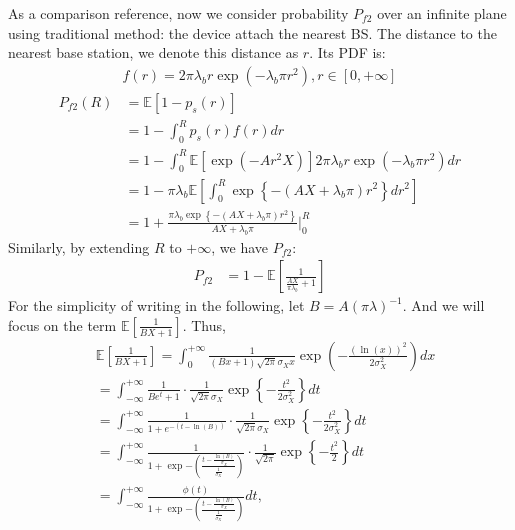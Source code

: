 As a comparison reference, now we consider probability $P_{f2}$ over an infinite plane using traditional method: the device attach the nearest BS.
The distance to the nearest base station, we denote this distance as $r$. Its PDF is:
\begin{align}
f\left( r\right)  = 2 \pi \lambda_b  r \exp(-\lambda_b \pi r^2), r \in \left[ 0, +\infty\right] 
\end{align}
\begin{align}
P_{f2}\left( R \right) &= \mathbb{E}\left[ 1-p_{s}\left(r\right) \right]  \nonumber\\
&= 1-\int_{0}^{R}   p_{s}\left(r\right)  f\left( r\right) dr \nonumber\\
&= 1-\int_{0}^{R} \mathbb{E}\left[ \exp(-A r^2 X)\right]  2 \pi \lambda_b  r \exp(-\lambda_b \pi r^2) dr \nonumber\\
&= 1-  \pi \lambda_b \mathbb{E}\left[ \int_{0}^{R} \exp\left\lbrace -\left( AX+\lambda_b \pi\right)  r^2 \right\rbrace    dr^2 \right] \nonumber\\
&= 1 + \frac{\pi \lambda_b \exp\left\lbrace -\left( AX+\lambda_b \pi\right)  r^2 \right\rbrace }{AX+\lambda_b \pi}\vert_{0}^{R} 
\end{align}
Similarly, by extending $R$ to $+\infty$, we have $P_{f2}$: 
\begin{align}
P_{f2} &= 1 - \mathbb{E}\left[ \frac{1}{\frac{AX}{\pi\lambda_b}+1} \right] \nonumber
\end{align}
For the simplicity  of writing in the following, let $B= A \left( \pi \lambda \right) ^{-1}$. And we will focus on the term $\mathbb{E}\left[ \frac{1}{BX+1} \right]$. Thus, 
\begin{align}
\label{eq:mean_bx+1_step1}
&\mathbb{E}\left[ \frac{1}{BX+1} \right] =  \int_{0}^{+\infty} \frac{1}{\left( Bx+1\right) \sqrt{2\pi}\sigma_X x} \exp(-\frac{(\ln(x))^2}{2\sigma_X^2})dx\nonumber\\
&= \int_{-\infty}^{+\infty} \frac{1}{ Be^t+1} \cdot \frac{1}{\sqrt{2\pi} \sigma_X} \exp\left\lbrace -\frac{t^2}{2 \sigma_X^2}\right\rbrace dt \nonumber\\
&= \int_{-\infty}^{+\infty} \frac{1}{1+e^{-(t-\ln(B))}} \cdot \frac{1}{\sqrt{2\pi} \sigma_X} \exp\left\lbrace -\frac{t^2}{2 \sigma_X^2}\right\rbrace dt \nonumber\\
&= \int_{-\infty}^{+\infty} \frac{1}{1+\exp{-\left( \frac{t-\frac{\ln(B)}{\sigma_X}}{\frac{1}{\sigma_X}}\right) }} \cdot \frac{1}{\sqrt{2\pi}} \exp\left\lbrace -\frac{t^2}{2}\right\rbrace dt \nonumber\\
& = \int_{-\infty}^{+\infty} \frac{\phi\left( t \right) }{1+\exp{-\left( \frac{t-\frac{\ln(B)}{\sigma_X}}{\frac{1}{\sigma_X}}\right) }} dt,
\end{align}
